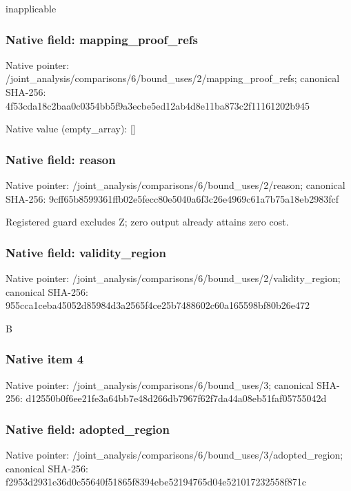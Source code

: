 \documentclass[10pt,a4paper]{article}
\begin{document}
\begingroup\raggedright\sloppy inapplicable\par\endgroup

\subsubsection{Native field: mapping\_\allowbreak{}proof\_\allowbreak{}refs}
Native pointer: /joint\_\allowbreak{}analysis/comparisons/6/bound\_\allowbreak{}uses/2/mapping\_\allowbreak{}proof\_\allowbreak{}refs; canonical SHA-256: 4f53cda18c2baa0c0354bb5f9a3ecbe5ed12ab4d8e11ba873c2f11161202b945

Native value (empty\_\allowbreak{}array): []

\subsubsection{Native field: reason}
Native pointer: /joint\_\allowbreak{}analysis/comparisons/6/bound\_\allowbreak{}uses/2/reason; canonical SHA-256: 9cff65b8599361ffb02e5fecc80e5040a6f3c26e4969c61a7b75a18eb2983fcf

\begingroup\raggedright\sloppy Registered guard excludes Z;\allowbreak{} zero output already attains zero cost.\par\endgroup

\subsubsection{Native field: validity\_\allowbreak{}region}
Native pointer: /joint\_\allowbreak{}analysis/comparisons/6/bound\_\allowbreak{}uses/2/validity\_\allowbreak{}region; canonical SHA-256: 955cca1ceba45052d85984d3a2565f4ce25b7488602c60a165598bf80b26e472

\begingroup\raggedright\sloppy B\par\endgroup

\subsubsection{Native item 4}
Native pointer: /joint\_\allowbreak{}analysis/comparisons/6/bound\_\allowbreak{}uses/3; canonical SHA-256: d12550b0f6ee21fe3a64bb7e48d266db7967f62f7da44a08eb51faf05755042d

\subsubsection{Native field: adopted\_\allowbreak{}region}
Native pointer: /joint\_\allowbreak{}analysis/comparisons/6/bound\_\allowbreak{}uses/3/adopted\_\allowbreak{}region; canonical SHA-256: f2953d2931e36d0c55640f51865f8394ebe52194765d04e521017232558f871c
\end{document}
